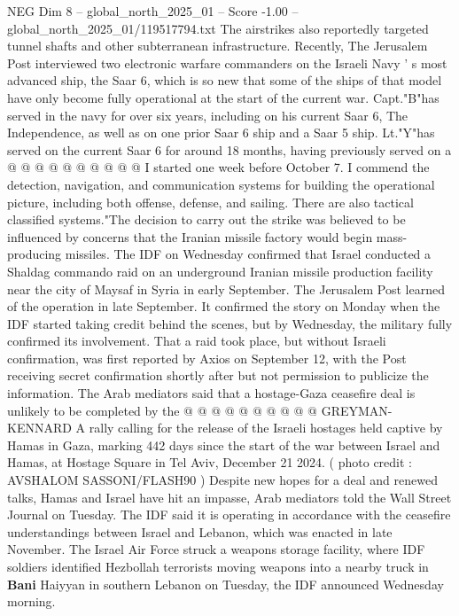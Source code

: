 \begin{textsample}{NEG Dim 8 – global\_north\_2025\_01 – Score -1.00 – global\_north\_2025\_01/119517794.txt}
The airstrikes also reportedly targeted tunnel shafts and other subterranean infrastructure.
Recently, The Jerusalem Post interviewed two electronic warfare commanders on the Israeli Navy ' s most advanced ship, the Saar 6, which is so new that some of the ships of that model have only become fully operational at the start of the current war.
Capt."B"has served in the navy for over six years, including on his current Saar 6, The Independence, as well as on one prior Saar 6 ship and a Saar 5 ship.
Lt."Y"has served on the current Saar 6 for around 18 months, having previously served on a @ @ @ @ @ @ @ @ @ @ I started one week before October 7.
I commend the detection, navigation, and communication systems for building the operational picture, including both offense, defense, and sailing.
There are also tactical classified systems."The decision to carry out the strike was believed to be influenced by concerns that the Iranian missile factory would begin mass-producing missiles.
The IDF on Wednesday confirmed that Israel conducted a Shaldag commando raid on an underground Iranian missile production facility near the city of Maysaf in Syria in early September.
The Jerusalem Post learned of the operation in late September.
It confirmed the story on Monday when the IDF started taking credit behind the scenes, but by Wednesday, the military fully confirmed its involvement.
That a raid took place, but without Israeli confirmation, was first reported by Axios on September 12, with the Post receiving secret confirmation shortly after but not permission to publicize the information.
The Arab mediators said that a hostage-Gaza ceasefire deal is unlikely to be completed by the @ @ @ @ @ @ @ @ @ @ GREYMAN-KENNARD A rally calling for the release of the Israeli hostages held captive by Hamas in Gaza, marking 442 days since the start of the war between Israel and Hamas, at Hostage Square in Tel Aviv, December 21 2024. ( photo credit : AVSHALOM SASSONI/FLASH90 ) Despite new hopes for a deal and renewed talks, Hamas and Israel have hit an impasse, Arab mediators told the Wall Street Journal on Tuesday.
The IDF said it is operating in accordance with the ceasefire understandings between Israel and Lebanon, which was enacted in late November.
The Israel Air Force struck a weapons storage facility, where IDF soldiers identified Hezbollah terrorists moving weapons into a nearby truck in \textbf{Bani} Haiyyan in southern Lebanon on Tuesday, the IDF announced Wednesday morning.

\end{textsample}
